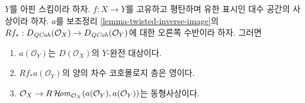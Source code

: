 \begin{lemma}
\label{lemma-properties-relative-dualizing}
$Y$를 아핀 스킴이라 하자. $f : X \to Y$를 고유하고 평탄하며
유한 표시인 대수 공간의 사상이라 하자. $a$를 보조정리
\ref{lemma-twisted-inverse-image}의
$Rf_* : D_{\mathit{QCoh}}(\mathcal{O}_X) \to D_{\mathit{QCoh}}(\mathcal{O}_Y)$에 대한
오른쪽 수반이라 하자. 그러면
\begin{enumerate}
\item $a(\mathcal{O}_Y)$는 $D(\mathcal{O}_X)$의 $Y$-완전 대상이다.
\item $Rf_*a(\mathcal{O}_Y)$의 양의 차수 코호몰로지 층은 영이다.
\item
$\mathcal{O}_X \to
R\mathop{\mathcal{H}\!\mathit{om}}\nolimits_{\mathcal{O}_X}(a(\mathcal{O}_Y), a(\mathcal{O}_Y))$는
동형사상이다.
\end{enumerate}
\end{lemma}


